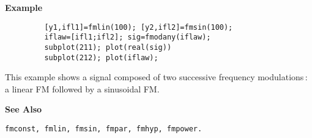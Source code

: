 {\bf \large {}\selectfont Example}\\
\hspace*{1.5cm}
\begin{minipage}[t]{13.5cm}
\begin{verbatim}
         [y1,ifl1]=fmlin(100); [y2,ifl2]=fmsin(100);
         iflaw=[ifl1;ifl2]; sig=fmodany(iflaw); 
         subplot(211); plot(real(sig))
         subplot(212); plot(iflaw); 
\end{verbatim}
This example shows a signal composed of two successive frequency
modulations\,: a linear FM followed by a sinusoidal FM.\\
\end{minipage}
\vspace*{.5cm}


{\bf \large {}\selectfont See Also}\\
\hspace*{1.5cm}
\begin{minipage}[t]{13.5cm}
\begin{verbatim}
fmconst, fmlin, fmsin, fmpar, fmhyp, fmpower.
\end{verbatim}
\end{minipage}



